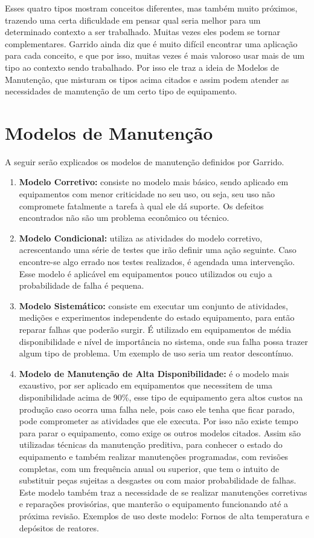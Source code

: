 Esses quatro tipos mostram conceitos diferentes, mas também muito próximos, trazendo uma certa dificuldade em pensar qual seria melhor para um determinado contexto a ser trabalhado. Muitas vezes eles podem se tornar complementares. Garrido \cite{garrido} ainda diz que é muito difícil encontrar uma aplicação para cada conceito, e que por isso, muitas vezes é mais valoroso usar mais de um tipo ao contexto sendo trabalhado. Por isso ele traz a ideia de Modelos de Manutenção, que misturam os tipos acima citados e assim podem atender as necessidades de manutenção de um certo tipo de equipamento.

\section{Modelos de Manutenção}
\label{sec_modelos_manutencao}

A seguir serão explicados os modelos de manutenção definidos por Garrido.

\begin{enumerate}
	\item \textbf{Modelo Corretivo:} consiste no modelo mais básico, sendo aplicado em equipamentos com menor criticidade no seu uso, ou seja, seu uso não compromete fatalmente a tarefa à qual ele dá suporte. Os defeitos encontrados não são um problema econômico ou técnico. 
	\item \textbf{Modelo Condicional:} utiliza as atividades do modelo corretivo, acrescentando uma série de testes que irão definir uma ação seguinte. Caso encontre-se algo errado nos testes realizados, é agendada uma intervenção. Esse modelo é aplicável em equipamentos pouco utilizados ou cujo a probabilidade de falha é pequena.
	\item \textbf{Modelo Sistemático:} consiste em executar um conjunto de atividades, medições e experimentos independente do estado equipamento, para então reparar falhas que poderão surgir. É utilizado em equipamentos de média disponibilidade e nível de importância no sistema, onde sua falha possa trazer algum tipo de problema. Um exemplo de uso seria um reator descontínuo. 
	\item \textbf{Modelo de Manutenção de Alta Disponibilidade:} é o modelo mais exaustivo, por ser aplicado em equipamentos que necessitem de uma disponibilidade acima de 90\%, esse tipo de equipamento gera altos custos na produção caso ocorra uma falha nele, pois caso ele tenha que ficar parado, pode comprometer as atividades que ele executa. Por isso não existe tempo para parar o equipamento, como exige os outros modelos citados. Assim são utilizadas técnicas da manutenção preditiva, para conhecer o estado do equipamento e também realizar manutenções programadas, com revisões completas, com um frequência anual ou superior, que tem o intuito de substituir peças sujeitas a desgastes ou com maior probabilidade de falhas. 
	\\
	Este modelo também traz a necessidade de se realizar manutenções corretivas e reparações provisórias, que manterão o equipamento funcionando até a próxima revisão. Exemplos de uso deste modelo: Fornos de alta temperatura e depósitos de reatores.
\end{enumerate} 

